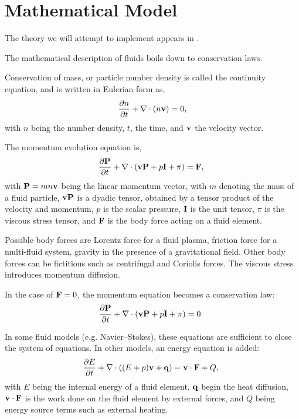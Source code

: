\section{Mathematical Model}

The theory we will attempt to implement appears in \cite{toro2013riemann}.

The mathematical description of fluids boils down to conservation laws. 

Conservation of mass, or particle number density is called the continuity equation, and is written in Eulerian form as,
\begin{gather}
	\frac{\partial n}{\partial t} + \nabla \cdot (n \mathbf{v}) = 0,
\end{gather}
with $n$ being the number density, $t$, the time, and $\mathbf{v}$ the velocity vector.

The momentum evolution equation is,
\begin{gather}
    \frac{\partial \mathbf{P}}{\partial t} + \nabla \cdot\left(\mathbf{v} \mathbf{P} + p \mathbf{I} + \pi\right) =  \mathbf{F},~\label{eq:momentum}
\end{gather}
with $\mathbf{P} = m n \mathbf{v}$ being the linear momentum vector, with $m$ denoting the mass of a fluid particle, $\mathbf{v} \mathbf{P}$ is a dyadic tensor, obtained by a tensor product of the velocity and momentum, $p$ is the scalar pressure, $\mathbf{I}$ is the unit tensor, $\pi$ is the viscous stress tensor, and $\mathbf{F}$ is the body force acting on a fluid element.

Possible body forces are Lorentz force for a fluid plasma, friction force for a multi-fluid system, gravity in the presence of a gravitational field. Other body forces can be fictitious such as centrifugal and Coriolis forces. The viscous stress introduces momentum diffusion.

In the case of $\mathbf{F}=0$, the momentum equation becomes a conservation law:
\begin{gather}
    \frac{\partial \mathbf{P}}{\partial t} + \nabla \cdot\left(\mathbf{v} \mathbf{P} + p \mathbf{I} + \pi\right) =  0.~\label{eq:momentum_conservation}
\end{gather}

In some fluid models (e.g. Navier–Stokes), these equations are sufficient to close the system of equations. In other models, an energy equation is added:
\begin{gather}
    \frac{\partial E}{\partial t} + \nabla \cdot\left( (E + p)\mathbf{v}+\mathbf{q}\right) =  \mathbf{v}\cdot\mathbf{F} + Q,~\label{eq:energy}
\end{gather}
with $E$ being the internal energy of a fluid element, $\mathbf{q}$ begin the heat diffusion, $\mathbf{v}\cdot\mathbf{F}$ is the work done on the fluid element by external forces, and $Q$ being energy source terms such as external heating.

